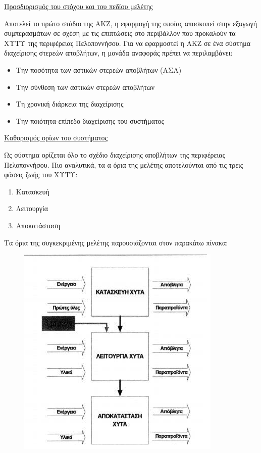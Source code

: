\documentclass[12pt]{article}
\begin{document}
 	\underline{Προσδιορισμός του στόχου και του πεδίου μελέτης}
 	
 	Αποτελεί το πρώτο στάδιο της ΑΚΖ, η εφαρμογή της οποίας αποσκοπεί στην εξαγωγή συμπερασμάτων σε σχέση με τις επιπτώσεις στο περιβάλλον που προκαλούν τα ΧΥΤΥ της περιφέρειας Πελοποννήσου. Για να εφαρμοστεί η ΑΚΖ σε ένα σύστημα διαχείρισης στερεών αποβλήτων, η μονάδα αναφοράς πρέπει να περιλαμβάνει:
 	
 	\begin{itemize}
 		\item Την ποσότητα των αστικών στερεών αποβλήτων (ΑΣΑ)
 		\item Την σύνθεση των αστικών στερεών αποβλήτων
 		\item Τη χρονική διάρκεια της διαχείρισης
 		\item Την ποιότητα-επίπεδο διαχείρισης του συστήματος
 	\end{itemize}
 
 	\underline{Καθορισμός ορίων του συστήματος}
 	
 	Ως σύστημα ορίζεται όλο το σχέδιο διαχείρισης αποβλήτων της περιφέρειας Πελοποννήσου. Πιο αναλυτικά, τα α όρια της μελέτης αποτελούνται από τις τρεις φάσεις ζωής του ΧΥΤΥ:
 	
 	\begin{enumerate}
 		\item Κατασκευή
 		\item Λειτουργία
 		\item Αποκατάσταση
 	\end{enumerate}
 
 	Τα όρια της συγκεκριμένης μελέτης παρουσιάζονται στον παρακάτω πίνακα:
 	
 	\begin{figure} [H]
 		\begin{center}
 			\includegraphics [scale = 0.70] {diagram6.png}
 		\end{center}
 	\end{figure}
 
\end{document}
